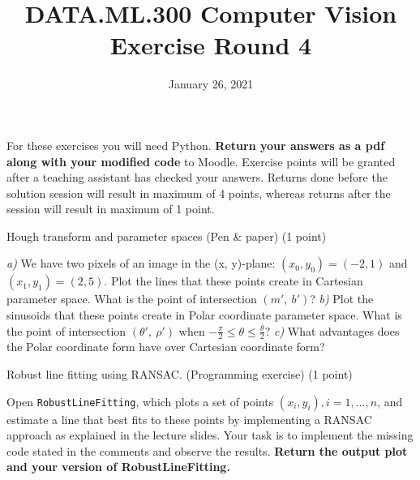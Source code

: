 \documentclass[12pt]{article} %
\title{DATA.ML.300 Computer Vision\\ Exercise Round 4}
\date{\vspace{-5mm} January 26, 2021}
\date{} %
\newenvironment{exercise}[2][Task]{\begin{trivlist}
\item[\hskip \labelsep {\bfseries #1}\hskip \labelsep {\bfseries #2.}]}{\end{trivlist}}
\begin{document}
\maketitle


\noindent For these exercises you will need Python. \textbf{Return your answers as a pdf along with your modified code} to Moodle. Exercise points will be granted after a teaching assistant has checked your answers. Returns done before the solution session will result in maximum of 4 points, whereas returns after the session will result in maximum of 1 point.


\begin{exercise}{1}
    Hough transform and parameter spaces (Pen \& paper) (1 point)
    
    \noindent \textit{a)} We have two pixels of an image in the (x, y)-plane:
    $(x_0, y_0) = (-2, 1)$ and $(x_1, y_1) = (2, 5)$.
    Plot the lines that these points create in Cartesian parameter space. What is the point of intersection $(m', \ b')$?
    \newline
    \noindent \textit{b)} Plot the sinusoids that these points create in Polar coordinate parameter space. What is the point of intersection $(\theta', \ \rho')$ when $-\frac{\pi}{2}\leq\theta\leq \frac{\theta}{2}?$
    \newline
    \noindent \textit{c)} What advantages does the Polar coordinate form have over Cartesian coordinate form?
    
    \vspace{1mm}


\begin{exercise}{2}
	Robust line fitting using RANSAC. (Programming exercise) (1 point)
	
	\noindent Open \texttt{RobustLineFitting}, which plots a set of points $(x_i,y_i), i=1,\ldots,n$, and estimate a line that best fits to these points by implementing a RANSAC approach as explained in the lecture slides. Your task is to implement the missing code stated in the comments and observe the results.
	\textbf{Return the output plot and your version of RobustLineFitting.}
	

\end{exercise}
\end{exercise}
\end{document}
